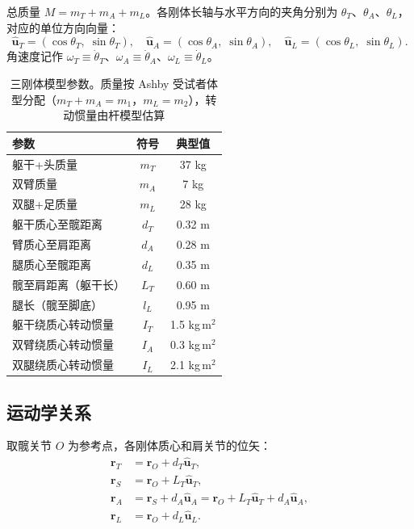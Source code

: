 \documentclass{article}
\begin{document}
总质量 $M = m_T + m_A + m_L$。各刚体长轴与水平方向的夹角分别为 $\theta_T$、$\theta_A$、$\theta_L$，对应的单位方向向量：
\[
\hat{\mathbf{u}}_T = (\cos\theta_T,\;\sin\theta_T),\quad
\hat{\mathbf{u}}_A = (\cos\theta_A,\;\sin\theta_A),\quad
\hat{\mathbf{u}}_L = (\cos\theta_L,\;\sin\theta_L).
\]
角速度记作 $\omega_T \equiv \dot\theta_T$、$\omega_A \equiv \dot\theta_A$、$\omega_L \equiv \dot\theta_L$。

\begin{table}[h]
\centering
\caption{三刚体模型参数。质量按 Ashby 受试者体型分配（$m_T+m_A = m_1$，$m_L = m_2$），转动惯量由杆模型估算}
\begin{tabular}{lcc}
\toprule
参数 & 符号 & 典型值 \\
\midrule
躯干+头质量           & $m_T$ & 37 kg \\
双臂质量              & $m_A$ & 7 kg \\
双腿+足质量           & $m_L$ & 28 kg \\
躯干质心至髋距离       & $d_T$ & 0.32 m \\
臂质心至肩距离         & $d_A$ & 0.28 m \\
腿质心至髋距离         & $d_L$ & 0.35 m \\
髋至肩距离（躯干长）    & $L_T$ & 0.60 m \\
腿长（髋至脚底）        & $l_L$ & 0.95 m \\
躯干绕质心转动惯量     & $I_T$ & 1.5 kg\,m$^2$ \\
双臂绕质心转动惯量     & $I_A$ & 0.3 kg\,m$^2$ \\
双腿绕质心转动惯量     & $I_L$ & 2.1 kg\,m$^2$ \\
\bottomrule
\end{tabular}
\end{table}

\subsection{运动学关系}

取髋关节 $O$ 为参考点，各刚体质心和肩关节的位矢：
\begin{align}
\mathbf{r}_T &= \mathbf{r}_O + d_T \hat{\mathbf{u}}_T, \label{eq:rT} \\
\mathbf{r}_S &= \mathbf{r}_O + L_T \hat{\mathbf{u}}_T, \label{eq:rS} \\
\mathbf{r}_A &= \mathbf{r}_S + d_A \hat{\mathbf{u}}_A
              = \mathbf{r}_O + L_T \hat{\mathbf{u}}_T + d_A \hat{\mathbf{u}}_A, \label{eq:rA} \\
\mathbf{r}_L &= \mathbf{r}_O + d_L \hat{\mathbf{u}}_L. \label{eq:rL}
\end{align}
\end{document}

